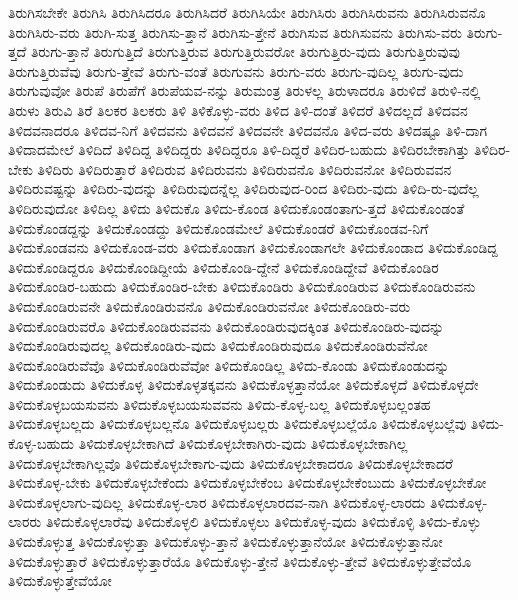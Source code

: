 {ತಿರುಗಿಸಬೇಕೇ
ತಿರುಗಿಸಿ
ತಿರುಗಿಸಿದರೂ
ತಿರುಗಿಸಿದರೆ
ತಿರುಗಿಸಿಯೇ
ತಿರುಗಿಸಿರು
ತಿರುಗಿಸಿರುವನು
ತಿರುಗಿಸಿರುವನೊ
ತಿರುಗಿಸಿರು-ವರು
ತಿರುಗಿ-ಸುತ್ತ
ತಿರುಗಿಸು-ತ್ತಾನೆ
ತಿರುಗಿಸು-ತ್ತೇನೆ
ತಿರುಗಿಸುವ
ತಿರುಗಿಸುವನು
ತಿರುಗಿಸು-ವರು
ತಿರುಗು-ತ್ತದೆ
ತಿರುಗು-ತ್ತಾನೆ
ತಿರುಗುತ್ತಿದೆ
ತಿರುಗುತ್ತಿರುವ
ತಿರುಗುತ್ತಿರುವರೋ
ತಿರುಗುತ್ತಿರು-ವುದು
ತಿರುಗುತ್ತಿರುವುವು
ತಿರುಗುತ್ತಿರುವೆವು
ತಿರುಗು-ತ್ತೇವೆ
ತಿರುಗು-ವಂತೆ
ತಿರುಗುವನು
ತಿರುಗು-ವರು
ತಿರುಗು-ವುದಿಲ್ಲ
ತಿರುಗು-ವುದು
ತಿರುಗುವುವೋ
ತಿರುಪೆ
ತಿರುಪೆಗೆ
ತಿರುಪೆಯವ-ನನ್ನು
ತಿರುಮಂತ್ರ
ತಿರುಳಲ್ಲ
ತಿರುಳಾದರೂ
ತಿರುಳಿದೆ
ತಿರುಳಿ-ನಲ್ಲಿ
ತಿರುಳು
ತಿರುವಿ
ತಿರೆ
ತಿಲಕರ
ತಿಲಕರು
ತಿಳಿ
ತಿಳಿಕೊಳ್ಳು-ವರು
ತಿಳಿದ
ತಿಳಿ-ದಂತೆ
ತಿಳಿದರೆ
ತಿಳಿದಲ್ಲದೆ
ತಿಳಿದವನ
ತಿಳಿದವನಾದರೂ
ತಿಳಿದವ-ನಿಗೆ
ತಿಳಿದವನು
ತಿಳಿದವನೆ
ತಿಳಿದವನೇ
ತಿಳಿದವನೊ
ತಿಳಿದ-ವರು
ತಿಳಿದಷ್ಟೂ
ತಿಳಿ-ದಾಗ
ತಿಳಿದಾದಮೇಲೆ
ತಿಳಿದಿದೆ
ತಿಳಿದಿದ್ದ
ತಿಳಿದಿದ್ದರು
ತಿಳಿದಿದ್ದರೂ
ತಿಳಿ-ದಿದ್ದರೆ
ತಿಳಿದಿರ-ಬಹುದು
ತಿಳಿದಿರಬೇಕಾಗಿತ್ತು
ತಿಳಿದಿರ-ಬೇಕು
ತಿಳಿದಿರು
ತಿಳಿದಿರುತ್ತಾರೆ
ತಿಳಿದಿರುವ
ತಿಳಿದಿರುವನು
ತಿಳಿದಿರುವನೊ
ತಿಳಿದಿರುವನೋ
ತಿಳಿದಿರುವವನ
ತಿಳಿದಿರುವಷ್ಟನ್ನು
ತಿಳಿದಿರು-ವುದನ್ನು
ತಿಳಿದಿರುವುದನ್ನೆಲ್ಲ
ತಿಳಿದಿರುವುದ-ರಿಂದ
ತಿಳಿದಿರು-ವುದು
ತಿಳಿದಿ-ರು-ವುದೆಲ್ಲ
ತಿಳಿದಿರುವುದೋ
ತಿಳಿದಿಲ್ಲ
ತಿಳಿದು
ತಿಳಿದುಕೊ
ತಿಳಿದು-ಕೊಂಡ
ತಿಳಿದುಕೊಂಡಂತಾಗು-ತ್ತದೆ
ತಿಳಿದುಕೊಂಡಂತೆ
ತಿಳಿದುಕೊಂಡದ್ದನ್ನು
ತಿಳಿದುಕೊಂಡದ್ದು
ತಿಳಿದುಕೊಂಡಮೇಲೆ
ತಿಳಿದುಕೊಂಡರೆ
ತಿಳಿದುಕೊಂಡವ-ನಿಗೆ
ತಿಳಿದುಕೊಂಡವನು
ತಿಳಿದುಕೊಂಡ-ವರು
ತಿಳಿದುಕೊಂಡಾಗ
ತಿಳಿದುಕೊಂಡಾಗಲೇ
ತಿಳಿದುಕೊಂಡಾದ
ತಿಳಿದುಕೊಂಡಿದ್ದ
ತಿಳಿದುಕೊಂಡಿದ್ದರೂ
ತಿಳಿದುಕೊಂಡಿದ್ದೀಯೆ
ತಿಳಿದುಕೊಂಡಿ-ದ್ದೇನೆ
ತಿಳಿದುಕೊಂಡಿದ್ದೇವೆ
ತಿಳಿದುಕೊಂಡಿರ
ತಿಳಿದುಕೊಂಡಿರ-ಬಹುದು
ತಿಳಿದುಕೊಂಡಿರ-ಬೇಕು
ತಿಳಿದುಕೊಂಡಿರು
ತಿಳಿದುಕೊಂಡಿರುವ
ತಿಳಿದುಕೊಂಡಿರುವನು
ತಿಳಿದುಕೊಂಡಿರುವನೇ
ತಿಳಿದುಕೊಂಡಿರುವನೊ
ತಿಳಿದುಕೊಂಡಿರುವನೋ
ತಿಳಿದುಕೊಂಡಿರು-ವರು
ತಿಳಿದುಕೊಂಡಿರುವರೊ
ತಿಳಿದುಕೊಂಡಿರುವವನು
ತಿಳಿದುಕೊಂಡಿರುವುದಕ್ಕಿಂತ
ತಿಳಿದುಕೊಂಡಿರು-ವುದನ್ನು
ತಿಳಿದುಕೊಂಡಿರುವುದಲ್ಲ
ತಿಳಿದುಕೊಂಡಿರು-ವುದು
ತಿಳಿದುಕೊಂಡಿರುವುದೂ
ತಿಳಿದುಕೊಂಡಿರುವೆನೋ
ತಿಳಿದುಕೊಂಡಿರುವೆವೊ
ತಿಳಿದುಕೊಂಡಿರುವೆವೋ
ತಿಳಿದುಕೊಂಡಿಲ್ಲ
ತಿಳಿದು-ಕೊಂಡು
ತಿಳಿದುಕೊಂಡುದನ್ನು
ತಿಳಿದುಕೊಂಡುದು
ತಿಳಿದುಕೊಳ್ಳ
ತಿಳಿದುಕೊಳ್ಳತಕ್ಕವನು
ತಿಳಿದುಕೊಳ್ಳತ್ತಾನೆಯೋ
ತಿಳಿದುಕೊಳ್ಳದೆ
ತಿಳಿದುಕೊಳ್ಳದೇ
ತಿಳಿದುಕೊಳ್ಳಬಯಸುವನು
ತಿಳಿದುಕೊಳ್ಳಬಯಸುವವನು
ತಿಳಿದು-ಕೊಳ್ಳ-ಬಲ್ಲ
ತಿಳಿದುಕೊಳ್ಳಬಲ್ಲಂತಹ
ತಿಳಿದುಕೊಳ್ಳಬಲ್ಲದು
ತಿಳಿದುಕೊಳ್ಳಬಲ್ಲನೊ
ತಿಳಿದುಕೊಳ್ಳಬಲ್ಲರು
ತಿಳಿದುಕೊಳ್ಳಬಲ್ಲೆಯೊ
ತಿಳಿದುಕೊಳ್ಳಬಲ್ಲೆವು
ತಿಳಿದು-ಕೊಳ್ಳ-ಬಹುದು
ತಿಳಿದುಕೊಳ್ಳಬೇಕಾಗಿದೆ
ತಿಳಿದುಕೊಳ್ಳಬೇಕಾಗಿರು-ವುದು
ತಿಳಿದುಕೊಳ್ಳಬೇಕಾಗಿಲ್ಲ
ತಿಳಿದುಕೊಳ್ಳಬೇಕಾಗಿಲ್ಲವೊ
ತಿಳಿದುಕೊಳ್ಳಬೇಕಾಗು-ವುದು
ತಿಳಿದುಕೊಳ್ಳಬೇಕಾದರೂ
ತಿಳಿದುಕೊಳ್ಳಬೇಕಾದರೆ
ತಿಳಿದುಕೊಳ್ಳ-ಬೇಕು
ತಿಳಿದುಕೊಳ್ಳಬೇಕೆಂದು
ತಿಳಿದುಕೊಳ್ಳಬೇಕೆಂಬ
ತಿಳಿದುಕೊಳ್ಳಬೇಕೆಂಬುದು
ತಿಳಿದುಕೊಳ್ಳಬೇಕೋ
ತಿಳಿದುಕೊಳ್ಳಲಾಗು-ವುದಿಲ್ಲ
ತಿಳಿದುಕೊಳ್ಳ-ಲಾರ
ತಿಳಿದುಕೊಳ್ಳಲಾರದವ-ನಾಗಿ
ತಿಳಿದುಕೊಳ್ಳ-ಲಾರದು
ತಿಳಿದುಕೊಳ್ಳ-ಲಾರರು
ತಿಳಿದುಕೊಳ್ಳಲಾರೆವು
ತಿಳಿದುಕೊಳ್ಳಲಿ
ತಿಳಿದುಕೊಳ್ಳಲು
ತಿಳಿದುಕೊಳ್ಳ-ವುದು
ತಿಳಿದುಕೊಳ್ಳಿ
ತಿಳಿದು-ಕೊಳ್ಳು
ತಿಳಿದುಕೊಳ್ಳುತ್ತ
ತಿಳಿದುಕೊಳ್ಳುತ್ತಾ
ತಿಳಿದುಕೊಳ್ಳು-ತ್ತಾನೆ
ತಿಳಿದುಕೊಳ್ಳುತ್ತಾನೆಯೋ
ತಿಳಿದುಕೊಳ್ಳುತ್ತಾನೋ
ತಿಳಿದುಕೊಳ್ಳುತ್ತಾರೆ
ತಿಳಿದುಕೊಳ್ಳುತ್ತಾರೆಯೊ
ತಿಳಿದುಕೊಳ್ಳು-ತ್ತೇನೆ
ತಿಳಿದುಕೊಳ್ಳು-ತ್ತೇವೆ
ತಿಳಿದುಕೊಳ್ಳುತ್ತೇವೆಯೊ
ತಿಳಿದುಕೊಳ್ಳುತ್ತೇವೆಯೋ
}

